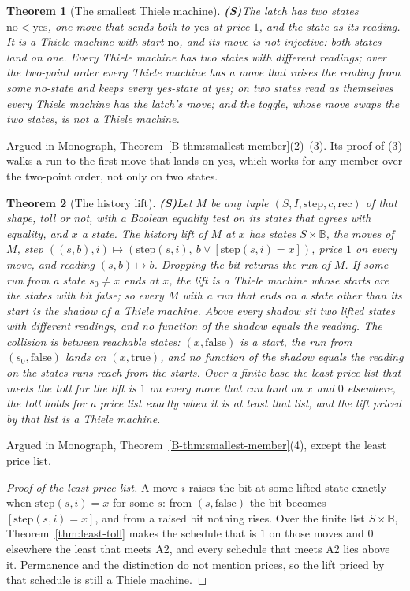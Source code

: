 \documentclass[11pt, a4paper]{report}
\theoremstyle{definition}
\theoremstyle{plain}
\newtheorem{theorem}{Theorem}[chapter]
\newcommand{\B}{\mathbb{B}}
\newcommand{\cost}{c}
\begin{document}
\begin{theorem}[The smallest Thiele machine] \textbf{(S)}\label{thm:latch}
The latch has two states $\mathrm{no} < \mathrm{yes}$, one move that sends both
to $\mathrm{yes}$ at price $1$, and the state as its reading. It is a Thiele
machine with start $\mathrm{no}$, and its move is
not injective: both states land on one. Every Thiele
machine has two states with different readings; over the two-point order every Thiele
machine has a move that raises the reading from some no-state and keeps every
yes-state at yes; on two states
read as themselves every Thiele machine has the latch's move; and the toggle, whose move
swaps the two states, is not a Thiele machine.
\end{theorem}
\noindent Argued in Monograph, Theorem~\ref{B-thm:smallest-member}(2)--(3). Its proof of (3)
walks a run to the first move that lands on yes, which works for any member over the two-point
order, not only on two states.

\begin{theorem}[The history lift] \textbf{(S)}\label{thm:history-lift}
Let $M$ be any tuple $(S, I, \mathrm{step}, \cost, \mathrm{rec})$ of that shape, toll or not, with a Boolean equality test on its states
that agrees with equality, and $x$ a state. The history lift of $M$ at $x$ has
states $S \times \B$, the moves of $M$, step
$((s,b), i) \mapsto (\mathrm{step}(s,i),\ b \vee [\mathrm{step}(s,i) = x])$,
price $1$ on every move, and reading $(s,b) \mapsto b$.
Dropping the bit returns the run of $M$. If
some run from a state $s_0 \ne x$ ends at $x$, the lift is a Thiele machine
whose starts are the states with bit false;
so every $M$ with a run that ends on a state other than its start is the shadow
of a Thiele machine. Above every
shadow sit two lifted states with different readings, and no function of the
shadow equals the reading. The collision is
between reachable states: $(x, \mathrm{false})$ is a start, the run from
$(s_0, \mathrm{false})$ lands on $(x, \mathrm{true})$, and no function of the
shadow equals the reading on the states runs reach from the starts. Over a finite
base the least price list that meets the toll for the lift is $1$ on every
move that can land on $x$ and $0$ elsewhere, the toll holds for a price list
exactly when it is at least that list, and the lift priced by that list is a
Thiele machine.
\end{theorem}
\noindent Argued in Monograph, Theorem~\ref{B-thm:smallest-member}(4), except the least price list.
\begin{proof}[Proof of the least price list]
A move $i$ raises the bit at some lifted state exactly when $\mathrm{step}(s,i) = x$ for some $s$:
from $(s,\mathrm{false})$ the bit becomes $[\mathrm{step}(s,i) = x]$, and from a raised bit nothing
rises. Over the finite list $S \times \B$, Theorem~\ref{thm:least-toll} makes the schedule that
is $1$ on those moves and $0$ elsewhere the least that meets A2, and every schedule that meets A2
lies above it. Permanence and the distinction do not mention prices, so the lift priced by that
schedule is still a Thiele machine.
\end{proof}
\end{document}

